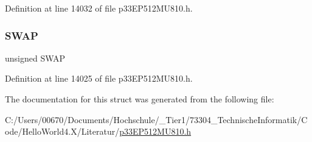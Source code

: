Definition at line 14032 of file p33\+E\+P512\+M\+U810.\+h.

\mbox{\label{structtag_i_o_c_o_n1_b_i_t_s_a3ed0654ceb192d32e26d2929c9b8dcc2}} 
\subsubsection{\texorpdfstring{S\+W\+AP}{SWAP}}
{\footnotesize\ttfamily unsigned S\+W\+AP}



Definition at line 14025 of file p33\+E\+P512\+M\+U810.\+h.



The documentation for this struct was generated from the following file\+:\begin{DoxyCompactItemize}
\item 
C\+:/\+Users/00670/\+Documents/\+Hochschule/\+\_\+\+Tier1/73304\+\_\+\+Technische\+Informatik/\+Code/\+Hello\+World4.\+X/\+Literatur/\hyperlink{p33_e_p512_m_u810_8h}{p33\+E\+P512\+M\+U810.\+h}\end{DoxyCompactItemize}
